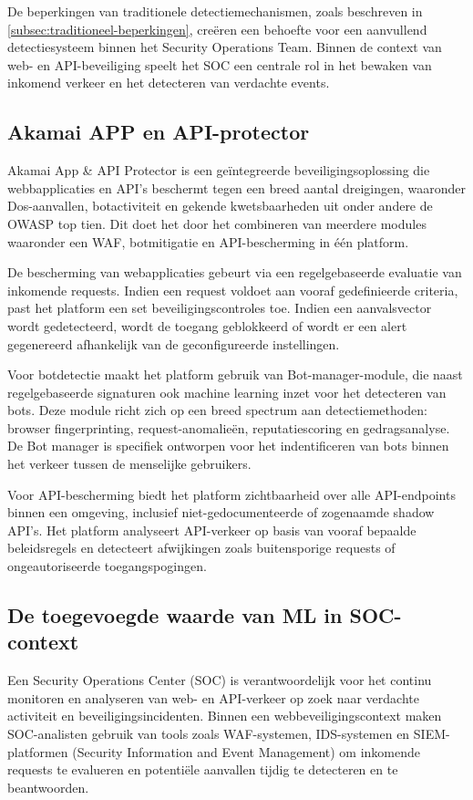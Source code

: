 De beperkingen van traditionele detectiemechanismen, zoals beschreven in \ref{subsec:traditioneel-beperkingen}, creëren een behoefte voor een aanvullend detectiesysteem binnen het Security Operations Team.  Binnen de context van web- en API-beveiliging speelt het SOC een centrale rol in het bewaken van inkomend verkeer en het detecteren van verdachte events.

\subsection{Akamai APP en API-protector}
\label{subsec:App-API}
Akamai App \& API Protector is een geïntegreerde beveiligingsoplossing die webbapplicaties en API's beschermt tegen een breed aantal dreigingen, waaronder Dos-aanvallen, botactiviteit en gekende kwetsbaarheden uit onder andere de OWASP top tien. Dit doet het door het combineren van meerdere modules waaronder een WAF, botmitigatie en API-bescherming in één platform.%

De bescherming van webapplicaties gebeurt via een regelgebaseerde evaluatie van inkomende requests. Indien een request voldoet aan vooraf gedefinieerde criteria, past het platform een set beveiligingscontroles toe. Indien een aanvalsvector wordt gedetecteerd, wordt de toegang geblokkeerd of wordt er een alert gegenereerd afhankelijk van de geconfigureerde instellingen\autocite{Technologies2026}.

Voor botdetectie maakt het platform gebruik van Bot-manager-module, die naast regelgebaseerde signaturen ook machine learning inzet voor het detecteren van bots. Deze module richt zich op een breed spectrum aan detectiemethoden: browser fingerprinting, request-anomalieën, reputatiescoring en gedragsanalyse. De Bot manager is specifiek ontworpen voor het indentificeren van bots binnen het verkeer tussen de menselijke gebruikers.%

Voor API-bescherming biedt het platform zichtbaarheid over alle API-endpoints binnen een omgeving, inclusief niet-gedocumenteerde of zogenaamde shadow  API's. Het platform analyseert API-verkeer op basis van vooraf bepaalde beleidsregels en detecteert afwijkingen zoals buitensporige requests of ongeautoriseerde toegangspogingen\autocite{Akamai2025}.
\subsection{De toegevoegde waarde van ML in SOC-context}
\label{subsec:toegevoegde-waarde-ML}
Een Security Operations Center (SOC) is verantwoordelijk voor het continu monitoren en analyseren van web- en API-verkeer op zoek naar verdachte activiteit en beveiligingsincidenten. Binnen een webbeveiligingscontext maken SOC-analisten gebruik van tools zoals WAF-systemen, IDS-systemen en SIEM-platformen (Security Information and Event Management) om inkomende requests te evalueren en potentiële aanvallen tijdig te detecteren en te beantwoorden.

